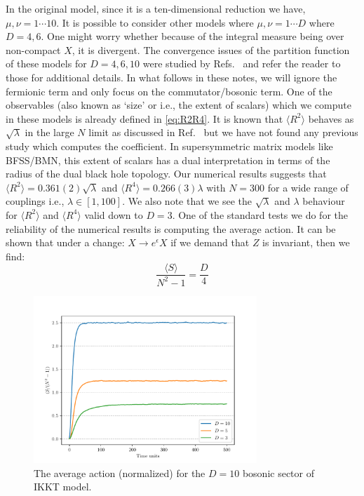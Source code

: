 \documentclass[11pt]{article}
\begin{document}
In the original model, since it is a ten-dimensional reduction we have, $\mu, \nu = 1 \cdots 10$. 
It is possible to consider other models where $\mu, \nu = 1 \cdots D$ where $D=4,6$. 
One might worry whether because of the integral measure being over non-compact $X$, 
it is divergent. The convergence issues of the partition function of 
these models for $D=4,6,10$ were studied by Refs.~\cite{Krauth:1998yu,Krauth:1999qw} and 
refer the reader to those for additional details.  
In what follows in these notes, we will ignore the fermionic 
term and only focus on the commutator/bosonic term. 
One of the observables (also known as `size' or i.e., the extent of scalars) 
which we compute in these models is already defined in \ref{eq:R2R4}. 
It is known that $\langle R^2 \rangle$ behaves as $\sqrt{\lambda}$ in the large $N$ limit 
as discussed in Ref.~\cite{Hotta:1998en} but we have not found any previous study
which computes the coefficient. In supersymmetric matrix models like BFSS/BMN, this 
extent of scalars has a dual interpretation in terms of the radius of 
the dual black hole topology.  Our numerical results suggests 
that $ \langle R^2 \rangle = 0.361(2) \sqrt{\lambda}$ 
and $ \langle R^4 \rangle = 0.266(3) \lambda$ with $N = 300$ for a wide range of couplings i.e., 
$\lambda \in [1,100]$. We also note that we see the $\sqrt{\lambda}$ and $\lambda$ behaviour for 
$\langle R^2 \rangle$ and $\langle R^4 \rangle$ valid down to $D=3$. 
One of the standard tests we do for the reliability of the numerical results is 
computing the average action. It can be shown that under a 
change: $X \to e^{\epsilon} X$ if we demand that $Z$ is invariant, 
then we find:
\begin{equation}
\label{eq:SD_IKKT1} 
	\frac{\langle S \rangle}{N^2 - 1} = \frac{D}{4} 
\end{equation}
\begin{figure}[htbp] 
	\centering 
	\includegraphics[width=0.75\textwidth]{figs/act_allD_YM.pdf}
	\caption{\label{fig:IKKT_2}The average action (normalized) for the $D=10$ bosonic sector of IKKT model.}
\end{figure}
\end{document}
